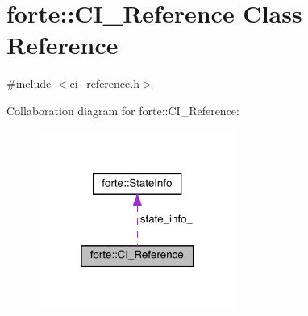 \hypertarget{classforte_1_1_c_i___reference}{}\section{forte\+:\+:C\+I\+\_\+\+Reference Class Reference}
\label{classforte_1_1_c_i___reference}


{\ttfamily \#include $<$ci\+\_\+reference.\+h$>$}



Collaboration diagram for forte\+:\+:C\+I\+\_\+\+Reference\+:
\nopagebreak
\begin{figure}[H]
\begin{center}
\leavevmode
\includegraphics[width=184pt]{classforte_1_1_c_i___reference__coll__graph}
\end{center}
\end{figure}
